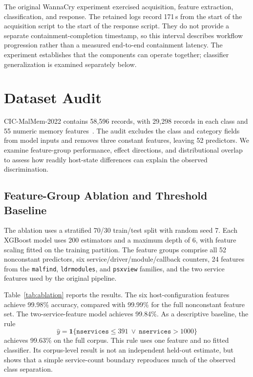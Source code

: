 \documentclass[conference]{IEEEtran}
\begin{document}
The original WannaCry experiment exercised acquisition, feature extraction,
classification, and response. The retained logs record 171\,s from the start
of the acquisition script to the start of the response script. They do not
provide a separate containment-completion timestamp, so this interval describes
workflow progression rather than a measured end-to-end containment latency.
The experiment establishes that the components can operate together; classifier
generalization is examined separately below.

\section{Dataset Audit}
\label{sec:diagnosis}

CIC-MalMem-2022 contains 58{,}596 records, with 29{,}298 records in each class
and 55 numeric memory features~\cite{carrier2022,cicmalmem}. The audit excludes
the class and category fields from model inputs and removes three constant
features, leaving 52 predictors. We examine feature-group performance, effect
directions, and distributional overlap to assess how readily host-state
differences can explain the observed discrimination.

\subsection{Feature-Group Ablation and Threshold Baseline}
The ablation uses a stratified 70/30 train/test split with random seed 7.
Each XGBoost model uses 200 estimators and a maximum depth of 6, with feature
scaling fitted on the training partition. The feature groups comprise all
52 nonconstant predictors, six service/driver/module/callback counters,
24 features from the \texttt{malfind}, \texttt{ldrmodules}, and
\texttt{psxview} families, and the two service features used by the original
pipeline.

Table~\ref{tab:ablation} reports the results. The six host-configuration
features achieve 99.98\% accuracy, compared with 99.99\% for the full
nonconstant feature set. The two-service-feature model achieves 99.84\%.
As a descriptive baseline, the rule
\begin{equation}
\hat{y}=\mathbf{1}\{\texttt{nservices}\leq391\ \lor\
                         \texttt{nservices}>1000\}
\end{equation}
achieves 99.63\% on the full corpus. This rule uses one feature and no fitted
classifier. Its corpus-level result is not an independent held-out estimate,
but shows that a simple service-count boundary reproduces much of the observed
class separation.
\end{document}

